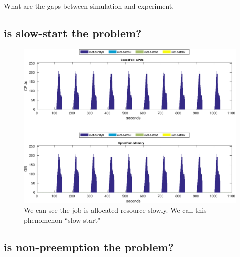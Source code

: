What are the gaps between simulation and experiment.

\subsection{is slow-start the problem?}
\begin{figure}
\centering
\includegraphics[width=1.0\linewidth]{fig/b3_res_usage_SpeedFair_BB_bursty}
\caption{ We can see the job is allocated resource slowly. We call this phenomenon ``slow start" }
\label{fig:b3_res_usage_SpeedFair_BB_only}
\end{figure}

\subsection{is non-preemption the problem?}

